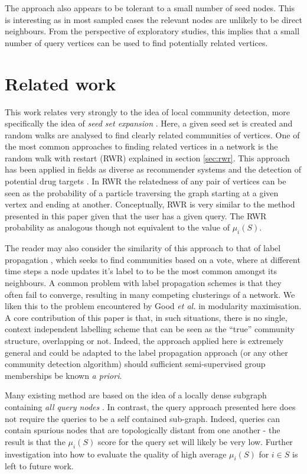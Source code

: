 \documentclass[sigconf]{acmart}
\begin{document}
The approach also appears to be tolerant to a small number of seed nodes.
This is interesting as in most sampled cases the relevant nodes are unlikely to be direct neighbours.
From the perspective of exploratory studies, this implies that a small number of query vertices can be used to find potentially related vertices.

\section{Related work}
\label{sec:related_work}
This work relates very strongly to the idea of local community detection, more specifically the idea of \textit{seed set expansion} \cite{gleich2012vertex}.
Here, a given seed set is created and random walks are analysed to find clearly related communities of vertices.
One of the most common approaches to finding related vertices in a network is the random walk with restart (RWR) \cite{can2005analysis, kohler2008walking} explained in section \ref{sec:rwr}.
This approach has been applied in fields as diverse as recommender systems and the detection of potential drug targets \cite{chen2012drug}.
In RWR the relatedness of any pair of vertices can be seen as the probability of a particle traversing the graph starting at a given vertex and ending at another.
Conceptually, RWR is very similar to the method presented in this paper given that the user has a given query.
The RWR probability as analogous though not equivalent to the value of $\mu_i(S)$.

The reader may also consider the similarity of this approach to that of label propagation \cite{raghavan2007near, gregory2010finding}, which seeks to find communities based on a vote, where at different time steps a node updates it's label to to be the most common amongst its neighbours.
A common problem with label propagation schemes is that they often fail to converge, resulting in many competing clusterings of a network.
We liken this to the problem encountered by Good \textit{et al.} \cite{good2010performance} in modularity maximisation.
A core contribution of this paper is that, in such situations, there is no single, context independent labelling scheme that can be seen as the ``true'' community structure, overlapping or not.
Indeed, the approach applied here is extremely general and could be adapted to the label propagation approach (or any other community detection algorithm) should sufficient semi-supervised group memberships be known \textit{a priori}.

Many existing method are based on the idea of a locally dense subgraph containing \textit{all query nodes} \cite{benson2016higher}.
In contrast, the query approach presented here does not require the queries to be a self contained sub-graph.
Indeed, queries can contain spurious nodes that are topologically distant from one another - the result is that the $\mu_i(S)$ score for the query set will likely be very low.
Further investigation into how to evaluate the quality of high average $\mu_i(S)$ for $i \in S$ is left to future work.
\end{document}
